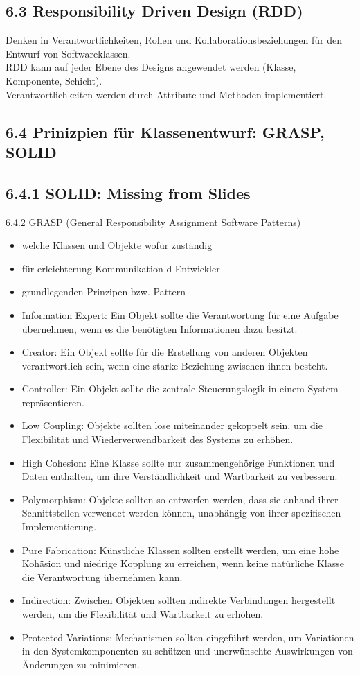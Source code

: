 \subsection*{6.3 Responsibility Driven Design (RDD)}
Denken in Verantwortlichkeiten, Rollen und Kollaborationsbeziehungen für den Entwurf von Softwareklassen.\\
RDD kann auf jeder Ebene des Designs angewendet werden (Klasse, Komponente, Schicht).\\
Verantwortlichkeiten werden durch Attribute und Methoden implementiert.

\subsection*{6.4 Prinizpien für Klassenentwurf: GRASP, SOLID}
\subsection*{6.4.1 SOLID: Missing from Slides}
6.4.2 GRASP (General Responsibility Assignment Software Patterns)

\begin{itemize}
  \item welche Klassen und Objekte wofür zuständig
  \item für erleichterung Kommunikation d Entwickler
  \item grundlegenden Prinzipen bzw. Pattern
  \item Information Expert: Ein Objekt sollte die Verantwortung für eine Aufgabe übernehmen, wenn es die benötigten Informationen dazu besitzt.
  \item Creator: Ein Objekt sollte für die Erstellung von anderen Objekten verantwortlich sein, wenn eine starke Beziehung zwischen ihnen besteht.
  \item Controller: Ein Objekt sollte die zentrale Steuerungslogik in einem System repräsentieren.
  \item Low Coupling: Objekte sollten lose miteinander gekoppelt sein, um die Flexibilität und Wiederverwendbarkeit des Systems zu erhöhen.
  \item High Cohesion: Eine Klasse sollte nur zusammengehörige Funktionen und Daten enthalten, um ihre Verständlichkeit und Wartbarkeit zu verbessern.
  \item Polymorphism: Objekte sollten so entworfen werden, dass sie anhand ihrer Schnittstellen verwendet werden können, unabhängig von ihrer spezifischen Implementierung.
  \item Pure Fabrication: Künstliche Klassen sollten erstellt werden, um eine hohe Kohäsion und niedrige Kopplung zu erreichen, wenn keine natürliche Klasse die Verantwortung übernehmen kann.
  \item Indirection: Zwischen Objekten sollten indirekte Verbindungen hergestellt werden, um die Flexibilität und Wartbarkeit zu erhöhen.
  \item Protected Variations: Mechanismen sollten eingeführt werden, um Variationen in den Systemkomponenten zu schützen und unerwünschte Auswirkungen von Änderungen zu minimieren.
\end{itemize}